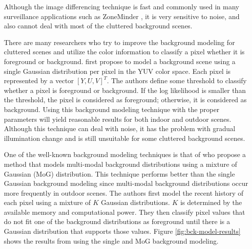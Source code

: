 Although the image differencing technique is fast and commonly used in
many surveillance applications such as
ZoneMinder , it is very sensitive to noise, and
also cannot deal with most of the cluttered background scenes.

There are many researchers who try to improve the background modeling
for cluttered scenes and utilize the color information to classify a
pixel whether it is foreground or
background.  first propose to model a
background scene using a single Gaussian distribution per pixel in the
YUV color space. Each pixel is represented by a vector $[Y, U,
V]^T$. The authors define some threshold to classify whether a pixel
is foreground or background. If the log likelihood is smaller than the
threshold, the pixel is considered as foreground; otherwise, it is
considered as background. Using this background modeling technique
with the proper parameters will yield reasonable results for both
indoor and outdoor scenes. Although this technique can deal with
noise, it has the problem with gradual illumination change and is
still unsuitable for some cluttered background scenes.

One of the well-known background modeling techniques is that
of  who propose a method that models
multi-modal background distributions using a mixture of Gaussian (MoG)
distribution. This technique performs better than the single Gaussian
background modeling since multi-modal background distributions occur
more frequently in outdoor scenes. The authors first model the recent
history of each pixel using a mixture of $K$ Gaussian
distributions. $K$ is determined by the available memory and
computational power. They then classify pixel values that do not fit
one of the background distributions as foreground until there is a
Gaussian distribution that supports those
values. Figure \ref{fig:bck-model-results} shows the results from
using the single and MoG background modeling\nocite{anh08thesis}.

